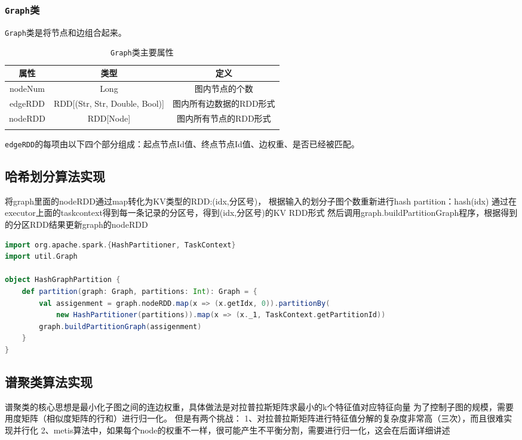 \subsubsection{\texttt{Graph}类}

\texttt{Graph}类是将节点和边组合起来。

\begin{table}[htbp]
    \centering
    \caption{\texttt{Graph}类主要属性}
    \begin{tabular}{ccc}
        \hline
        属性& 类型 & 定义\\
        \hline
        nodeNum & Long & 图内节点的个数 \\
        edgeRDD & RDD[(Str, Str, Double, Bool)] & 图内所有边数据的RDD形式\\
        nodeRDD & RDD[Node] & 图内所有节点的RDD形式\\
        \hline
        \centering
    \end{tabular}
\end{table}

\texttt{edgeRDD}的每项由以下四个部分组成：起点节点Id值、终点节点Id值、边权重、是否已经被匹配。

\subsection{哈希划分算法实现}
将graph里面的nodeRDD通过map转化为KV类型的RDD:(idx,分区号)，
根据输入的划分子图个数重新进行hash partition：hash(idx)%
通过在executor上面的taskcontext得到每一条记录的分区号，得到(idx,分区号)的KV RDD形式
然后调用graph.buildPartitionGraph程序，根据得到的分区RDD结果更新graph的nodeRDD
\begin{lstlisting}[language=Scala]
import org.apache.spark.{HashPartitioner, TaskContext}
import util.Graph

object HashGraphPartition {
    def partition(graph: Graph, partitions: Int): Graph = {
        val assigenment = graph.nodeRDD.map(x => (x.getIdx, 0)).partitionBy(
            new HashPartitioner(partitions)).map(x => (x._1, TaskContext.getPartitionId))
        graph.buildPartitionGraph(assigenment)
    }
}
\end{lstlisting}

\subsection{谱聚类算法实现}

谱聚类的核心思想是最小化子图之间的连边权重，具体做法是对拉普拉斯矩阵求最小的k个特征值对应特征向量
为了控制子图的规模，需要用度矩阵（相似度矩阵的行和）进行归一化。
但是有两个挑战：
1、对拉普拉斯矩阵进行特征值分解的复杂度非常高（三次），而且很难实现并行化
2、metis算法中，如果每个node的权重不一样，很可能产生不平衡分割，需要进行归一化，这会在后面详细讲述

